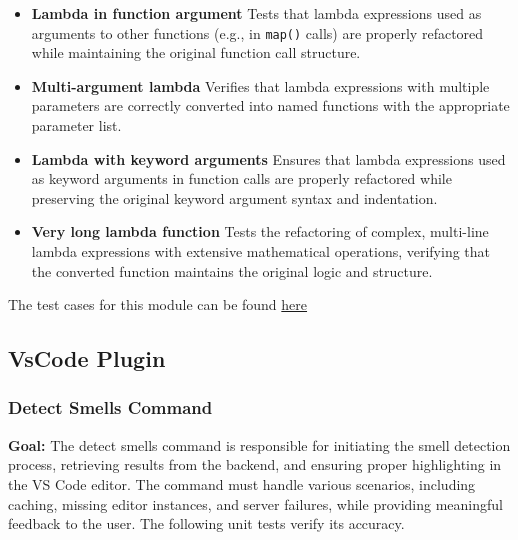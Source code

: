 \documentclass[12pt, titlepage]{article}
\begin{document}
\begin{enumerate}[label={\bf \textcolor{Maroon}{test-SRT-\arabic*}}, wide=0pt, font=\itshape]
\begin{itemize}
    \item \textbf{Lambda in function argument} \newline
    Tests that lambda expressions used as arguments to other functions (e.g., in \texttt{map()} calls) are properly refactored while maintaining the original function call structure.

    \item \textbf{Multi-argument lambda} \newline
    Verifies that lambda expressions with multiple parameters are correctly converted into named functions with the appropriate parameter list.

    \item \textbf{Lambda with keyword arguments} \newline
    Ensures that lambda expressions used as keyword arguments in function calls are properly refactored while preserving the original keyword argument syntax and indentation.

    \item \textbf{Very long lambda function} \newline
    Tests the refactoring of complex, multi-line lambda expressions with extensive mathematical operations, verifying that the converted function maintains the original logic and structure.
\end{itemize}

\noindent The test cases for this module can be found \href{https://github.com/ssm-lab/capstone--source-code-optimizer/blob/new-poc/tests/refactorers/test_long_lambda_element_refactoring.py}{here}


\subsection{VsCode Plugin}

\subsubsection{Detect Smells Command}

\textbf{Goal:} The detect smells command is responsible for initiating the smell detection process, retrieving results from the backend, and ensuring proper highlighting in the VS Code editor. The command must handle various scenarios, including caching, missing editor instances, and server failures, while providing meaningful feedback to the user. The following unit tests verify its accuracy.\\


\end{enumerate}
\end{document}
